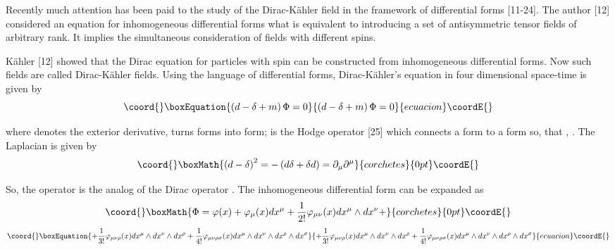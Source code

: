 \documentclass[a4paper,12pt]{article}
\begin{document}
Recently much attention has been paid to the study of the Dirac-K\"ahler
field in the framework of differential forms [11-24]. The author [12]
considered an equation for inhomogeneous differential forms what is
equivalent to introducing a set of antisymmetric tensor fields of arbitrary
rank. It implies the simultaneous consideration of fields with different
spins.

K\"ahler [12] showed that the Dirac equation for particles with spin \coordHE{}
can be constructed from inhomogeneous differential forms. Now such fields
are called Dirac-K\"ahler fields. Using the language of differential forms,
Dirac-K\"ahler's equation in four dimensional space-time is given by
\begin{equation}\coord{}\boxEquation{
\left( d-\delta +m\right) \Phi =0  \label{1}
}{
\left( d-\delta +m\right) \Phi =0  }{ecuacion}\coordE{}\end{equation}

where \coordHE{} denotes the exterior derivative, \coordHE{} turns \coordHE{}forms into \coordHE{}form; \myHighlight{$\star $}\coordHE{} is the Hodge
operator [25] which connects a \coordHE{}form to a \coordHE{}form so, that
\coordHE{}, \coordHE{}. The Laplacian is given by
\[\coord{}\boxMath{
\left( d-\delta \right) ^2=-\left( d\delta +\delta d\right)
=\partial _\mu \partial ^\mu
}{corchetes}{0pt}\coordE{}\]

So, the operator \coordHE{} is the analog of the
Dirac operator \myHighlight{$\gamma _\mu \partial ^\mu $}\coordHE{}. The inhomogeneous
differential form \myHighlight{$ \Phi $}\coordHE{} can be expanded as
\[\coord{}\boxMath{
\Phi =\varphi (x)+\varphi _\mu (x)dx^\mu +\frac 1{2!}\varphi _{\mu \nu
}(x)dx^\mu \wedge dx^\nu +
}{corchetes}{0pt}\coordE{}\]
\begin{equation}\coord{}\boxEquation{
+\frac 1{3!}\varphi _{\mu \nu \rho }(x)dx^\mu \wedge dx^\nu \wedge dx^\rho
+\frac 1{4!}\varphi _{\mu \nu \rho \sigma }(x)dx^\mu \wedge dx^\nu \wedge
dx^\rho \wedge dx^\sigma  \label{2}
}{
+\frac 1{3!}\varphi _{\mu \nu \rho }(x)dx^\mu \wedge dx^\nu \wedge dx^\rho
+\frac 1{4!}\varphi _{\mu \nu \rho \sigma }(x)dx^\mu \wedge dx^\nu \wedge
dx^\rho \wedge dx^\sigma  }{ecuacion}\coordE{}\end{equation}
\end{document}
